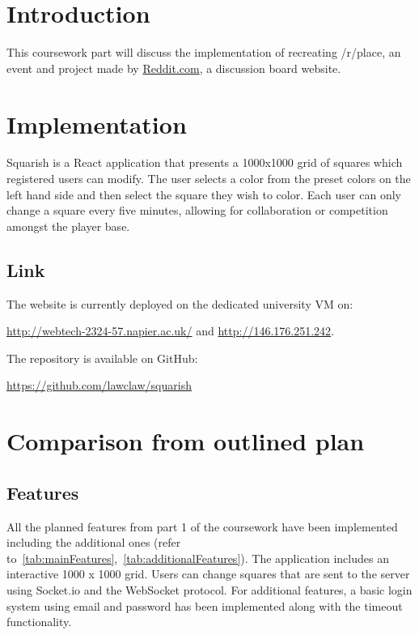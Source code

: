 


\section{Introduction}\label{sec:introduction}

This coursework part will discuss the implementation of recreating /r/place, an event and project made by \href{https://www.reddit.com/}{Reddit.com}, a discussion board website.


\section{Implementation}\label{sec:implementation}

Squarish is a React application that presents a 1000x1000 grid of squares which registered users can modify.
The user selects a color from the preset colors on the left hand side and then select the square they wish to color.
Each user can only change a square every five minutes, allowing for collaboration or competition amongst the player base.

\subsection{Link}\label{subsec:link}
The website is currently deployed on the dedicated university VM on:
\begin{center}
    \url{http://webtech-2324-57.napier.ac.uk/} and \url{http://146.176.251.242}.
\end{center}

The repository is available on GitHub:
\begin{center}
    \url{https://github.com/lawclaw/squarish}
\end{center}


\section{Comparison from outlined plan}\label{sec:comparison-from-outlined-plan}

\subsection{Features}\label{subsec:features2}
All the planned features from part 1 of the coursework have been implemented including the additional ones (refer to~\ref{tab:mainFeatures},~\ref{tab:additionalFeatures}).
The application includes an interactive 1000 x 1000 grid.
Users can change squares that are sent to the server using Socket.io and the WebSocket protocol.
For additional features, a basic login system using email and password has been implemented along with the timeout functionality.

